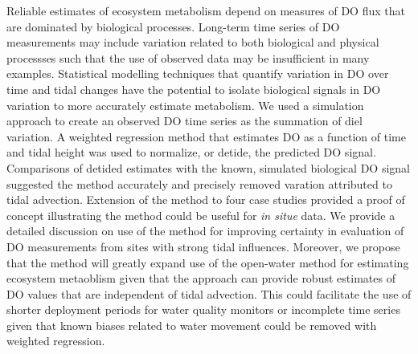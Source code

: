 Reliable estimates of ecosystem metabolism depend on measures of \ac{DO} flux that are dominated by biological processes.  Long-term time series of \ac{DO} measurements may include variation related to both biological and physical processses such that the use of observed data may be insufficient in many examples.  Statistical modelling techniques that quantify variation in \ac{DO} over time and tidal changes have the potential to isolate biological signals in \ac{DO} variation to more accurately estimate metabolism.  We used a simulation approach to create an observed \ac{DO} time series as the summation of diel variation.  A weighted regression method that estimates \ac{DO} as a function of time and tidal height was used to normalize, or detide, the predicted \ac{DO} signal.  Comparisons of detided estimates with the known, simulated biological \ac{DO} signal suggested the method accurately and precisely removed varation attributed to tidal advection.  Extension of the method to four case studies provided a proof of concept illustrating the method could be useful for \textit{in situe} data. We provide a detailed discussion on use of the method for improving certainty in evaluation of \ac{DO} measurements from sites with strong tidal influences.  Moreover, we propose that the method will greatly expand use of the open-water method for estimating ecosystem metaoblism given that the approach can provide robust estimates of \ac{DO} values that are independent of tidal advection.  This could facilitate the use of shorter deployment periods for water quality monitors or incomplete time series given that known biases related to water movement could be removed with weighted regression. 